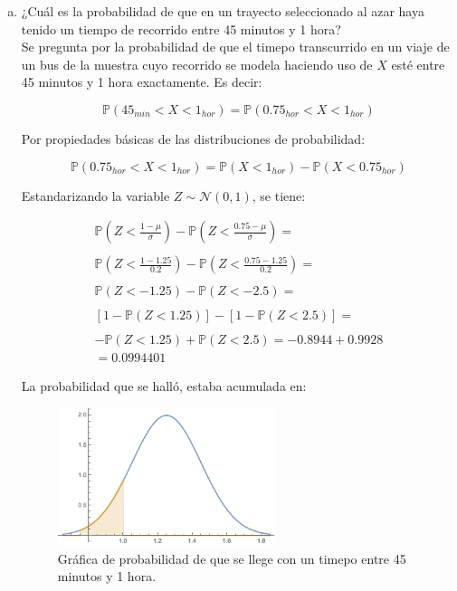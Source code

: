 \documentclass[11pt, spanish]{article}
\begin{document}
\begin{enumerate}[(a)]
\item ¿Cuál es la probabilidad de que en un trayecto seleccionado al azar haya tenido
un tiempo de recorrido entre 45 minutos y 1 hora?\\

Se pregunta por la probabilidad de que el timepo transcurrido en un viaje de un bus de la muestra cuyo recorrido se modela haciendo uso de $X$ esté entre 45 minutos y 1 hora exactamente. Es decir:

$$\mathbb{P}(45_{min} < X < 1_{hor}) = \mathbb{P}(0.75_{hor} < X < 1_{hor})$$
 
Por propiedades básicas de las distribuciones de probabilidad:
 
$$\mathbb{P}(0.75_{hor} < X < 1_{hor}) = \mathbb{P}(X < 1_{hor}) - \mathbb{P}(X < 0.75_{hor})$$

Estandarizando la variable $Z \sim \mathcal{N} (0, 1)$, se tiene:

\begin{equation}
    \begin{aligned}
    \mathbb{P}\left(Z < \frac{1 - \mu}{\sigma} \right) - \mathbb{P}\left(Z < \frac{0.75 - \mu}{\sigma} \right) =
    \\
    \\
     \mathbb{P}\left(Z < \frac{1 - 1.25}{0.2} \right) - \mathbb{P}\left(Z < \frac{0.75 - 1.25}{0.2} \right) = 
     \\
     \\
     \mathbb{P}\left(Z < -1.25 \right) - \mathbb{P}\left(Z < -2.5 \right) =
     \\
     \\
     \left[ 1 -  \mathbb{P}\left(Z < 1.25 \right) \right] - \left[ 1 - \mathbb{P}\left(Z < 2.5 \right) \right] = 
     \\
     \\
      -\mathbb{P}\left(Z < 1.25 \right) +  \mathbb{P}\left(Z < 2.5 \right) =
      -0.8944 + 0.9928 
      \\
      = 0.0994401
\end{aligned}
\end{equation}

\pagebreak
La probabilidad que se halló, estaba acumulada en:

\begin{figure}[h]
    \centering
    \includegraphics[width=0.6\textwidth]{fig3-3.png}
    \caption{Gráfica de probabilidad de que se llege con un timepo entre 45 minutos y 1 hora.}
    \label{fig:prob_dist2}
\end{figure} 


\end{enumerate}
\end{document}

